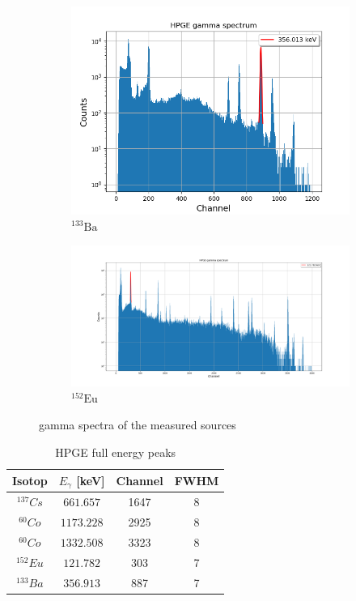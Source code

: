 \begin{figure}[h]
\begin{subfigure}{.5\textwidth}
  \centering
  \includegraphics[width=.9\linewidth]{../Plots/hpge_ba.png}
  \caption{$^{133}\text{Ba}$}
\end{subfigure}%
\begin{subfigure}{.5\textwidth}
  \centering
  \includegraphics[width=.9\linewidth]{../Plots/hpge_eu.png}
  \caption{$^{152}\text{Eu}$}
\end{subfigure}%
\caption{gamma spectra of the measured sources}
\label{hpge}
\end{figure}

\begin{table}[h]
\centering
\begin{tabular}{c |c | c |c}
\hline
Isotop & $E_{\gamma}$ [keV]  & Channel & FWHM \\
\hline
$^{137}Cs$ & $661.657$ & 1647 & 8 \\
$^{60}Co$ & $1173.228$ & 2925 & 8 \\
$^{60}Co$ & $1332.508$  & 3323 & 8 \\
$^{152}Eu$ & $121.782$  & 303 & 7 \\
$^{133}Ba$ & $356.913$  & 887 & 7 \\
\hline
\end{tabular}
\caption{HPGE full energy peaks}
\label{hpge_peaks}
\end{table}

